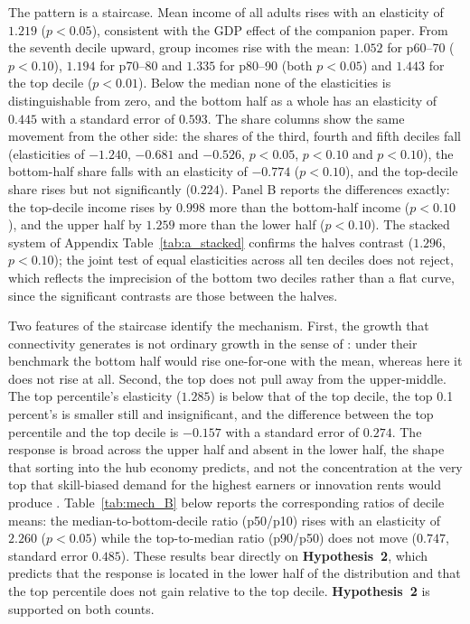 The pattern is a staircase. Mean income of all adults rises with an elasticity of $1.219$ ($p<0.05$), consistent with the GDP effect of the companion paper. From the seventh decile upward, group incomes rise with the mean: $1.052$ for p60--70 ($p<0.10$), $1.194$ for p70--80 and $1.335$ for p80--90 (both $p<0.05$) and $1.443$ for the top decile ($p<0.01$). Below the median none of the elasticities is distinguishable from zero, and the bottom half as a whole has an elasticity of $0.445$ with a standard error of $0.593$. The share columns show the same movement from the other side: the shares of the third, fourth and fifth deciles fall (elasticities of $-1.240$, $-0.681$ and $-0.526$, $p<0.05$, $p<0.10$ and $p<0.10$), the bottom-half share falls with an elasticity of $-0.774$ ($p<0.10$), and the top-decile share rises but not significantly ($0.224$). Panel B reports the differences exactly: the top-decile income rises by $0.998$ more than the bottom-half income ($p<0.10$), and the upper half by $1.259$ more than the lower half ($p<0.10$). The stacked system of Appendix Table~\ref{tab:a_stacked} confirms the halves contrast ($1.296$, $p<0.10$); the joint test of equal elasticities across all ten deciles does not reject, which reflects the imprecision of the bottom two deciles rather than a flat curve, since the significant contrasts are those between the halves.

Two features of the staircase identify the mechanism. First, the growth that connectivity generates is not ordinary growth in the sense of \citet{Dollar_2016}: under their benchmark the bottom half would rise one-for-one with the mean, whereas here it does not rise at all. Second, the top does not pull away from the upper-middle. The top percentile's elasticity ($1.285$) is below that of the top decile, the top 0.1 percent's is smaller still and insignificant, and the difference between the top percentile and the top decile is $-0.157$ with a standard error of $0.274$. The response is broad across the upper half and absent in the lower half, the shape that sorting into the hub economy predicts, and not the concentration at the very top that skill-biased demand for the highest earners or innovation rents would produce \citep{Aghion_2018}. Table~\ref{tab:mech_B} below reports the corresponding ratios of decile means: the median-to-bottom-decile ratio (p50/p10) rises with an elasticity of $2.260$ ($p<0.05$) while the top-to-median ratio (p90/p50) does not move ($0.747$, standard error $0.485$). These results bear directly on \textbf{Hypothesis~2}, which predicts that the response is located in the lower half of the distribution and that the top percentile does not gain relative to the top decile. \textbf{Hypothesis~2} is supported on both counts.

